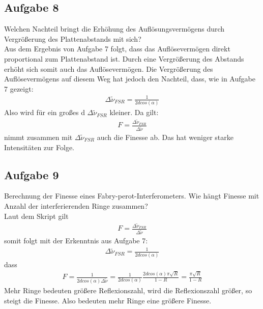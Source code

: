 \documentclass[a4paper,10pt]{scrartcl}
\begin{document}
	\subsection{Aufgabe 8}
	Welchen Nachteil bringt die Erhöhung des Auflösungsvermögens durch Vergrößerung des
	Plattenabstands mit sich?\\
	Aus dem Ergebnis von Aufgabe 7 folgt, dass das Auflösevermögen direkt proportional zum Plattenabstand ist. Durch eine Vergrößerung des Abstands erhöht sich somit auch das Auflösevermögen. Die Vergrößerung des Auflösevermögens auf diesem Weg hat jedoch den Nachteil, dass, wie in Aufgabe 7 gezeigt:
	\begin{align*}
	\Delta\tilde{\nu}_{FSR}=\frac{1}{2dcos(\alpha)}
	\end{align*}
	Also wird für ein großes d \(	\Delta\tilde{\nu}_{FSR}\) kleiner. Da gilt:
	\begin{align*}
	F=\frac{\Delta \tilde{\nu}_{FSR}}{\Delta \tilde{\nu}}
	\end{align*}
	nimmt zusammen mit \(\Delta\tilde{\nu}_{FSR}\) auch die Finesse ab. Das hat weniger starke Intensitäten zur Folge.
	\subsection{Aufgabe 9}
	Berechnung der Finesse eines Fabry-perot-Interferometers. Wie hängt Finesse mit Anzahl der interferierenden Ringe zusammen?\\
	Laut dem Skript gilt
	\begin{align*}
	F=\frac{\Delta \tilde{\nu}_{FSR}}{\Delta \tilde{\nu}}
	\end{align*}
	somit folgt mit der Erkenntnis aus Aufgabe 7:
	\begin{align*}
	\Delta\tilde{\nu}_{FSR}=\frac{1}{2dcos(\alpha)}
	\end{align*}
	dass
	\begin{align*}
	F=\frac{1}{2dcos(\alpha)\Delta\tilde{\nu}}=\frac{1}{2dcos(\alpha)}\frac{2dcos(\alpha)\pi \sqrt{R}}{1-R}=\frac{\pi \sqrt{R}}{1-R}
	\end{align*}
	Mehr Ringe bedeuten größere Reflexionszahl, wird die Reflexionszahl größer, so steigt die Finesse. Also bedeuten mehr Ringe eine größere Finesse.
\end{document}
